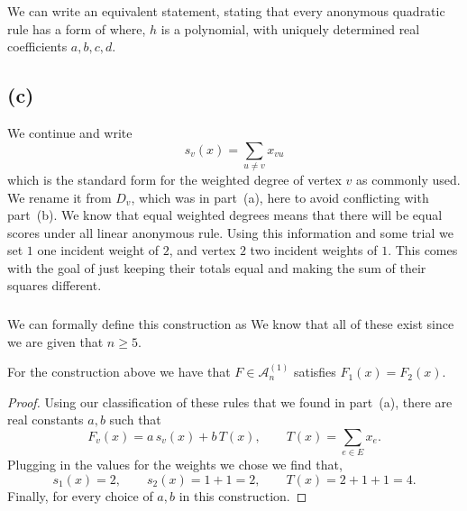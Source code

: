 \documentclass[11pt]{scrartcl}
\begin{document}
\begin{soln}
	We can write an equivalent statement, stating that 
	every anonymous quadratic rule has a form of
    where, $h$ is a polynomial,
    with uniquely determined real coefficients $a,b,c,d$.
\end{soln}
\subsection{(c)}

\begin{soln}
 We continue
	and
    write
    \[
    s_v(x)=\sum_{u\ne v}x_{vu}
    \]
	which is the standard form for the weighted degree of vertex $v$
	as commonly used. We rename it from $D_v$, which was in 
    part~(a), here to avoid conflicting with part~(b).
    We know that equal weighted degrees
	means that there will be equal scores under all linear anonymous rule.
    Using this information and some trial
	we set $1$ one incident weight of $2$, and
    vertex $2$ two incident weights of $1$. This comes with the goal
	of just keeping their totals equal and making the sum of their 
	squares different.

    \subsubsection*{}

    We can formally define this construction as 
	We know that all of these exist since we are given that $n \ge 5$. 

    \begin{claim*}
        For the construction above we have that
		 $F\in\mathcal A_n^{(1)}$ satisfies
        $F_1(x)=F_2(x)$.
    \end{claim*}

    \begin{proof}
        Using our classification of these rules that
		we found in part~(a), there are real constants
        $a,b$ such that
        \[
        F_v(x)=a\,s_v(x)+b\,T(x),
        \qquad
        T(x)=\sum_{e\in E}x_e.
        \]
        Plugging in the values for the weights we chose we find that,
        \[
        s_1(x)=2,\qquad
        s_2(x)=1+1=2,\qquad
        T(x)=2+1+1=4.
        \]
        Finally,
        for every choice of $a,b$ in this construction.
    \end{proof}


\end{soln}
\end{document}
